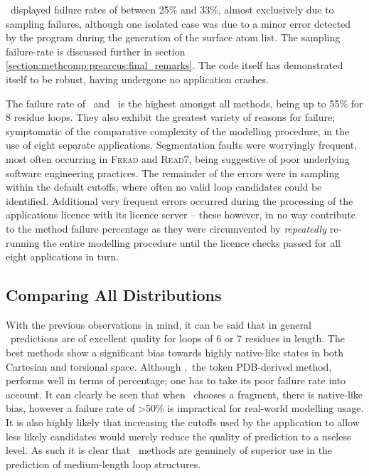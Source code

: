 \prearcus\ displayed failure rates of between 25\% and 33\%, almost exclusively due to sampling failures, although one isolated case was due to a minor error detected by the program during the generation of the surface atom list.
The sampling failure-rate is discussed further in section 
\ref{section:methcomp:prearcus:final_remarks}. The code itself has demonstrated itself to be robust, having undergone no application crashes.

The failure rate of \petra\ and \coda\ is the highest amongst all methods, being up to 55\% for 8 residue loops. They also exhibit the greatest variety of reasons for failure; symptomatic of the comparative complexity of the modelling procedure, in the use of eight separate applications. Segmentation faults were worryingly frequent, most often occurring in  \textsc{Fread} and \textsc{Read7}, being suggestive of poor underlying software engineering practices. The remainder of the errors were in sampling within the default cutoffs, where often no valid loop candidates could be identified.
Additional very frequent errors occurred during the processing of the applications licence with its licence server -- these however, in no way contribute to the method failure percentage as they were circumvented by \emph{repeatedly} re-running the entire modelling procedure until the licence checks passed for all eight applications in turn.


\subsection{Comparing All Distributions}

With the previous observations in mind, it can be said that in general \abinitio\ predictions are of excellent quality for loops of 6 or 7 residues in length. The best methods show a significant bias towards highly native-like states in both Cartesian and torsional space. Although \coda,\ the token PDB-derived method, performs well in terms of percentage; one has to take its poor failure rate into account. It can clearly be seen that when \coda\ chooses a fragment, there is native-like bias, however a failure rate of \textgreater50\% is impractical for real-world modelling usage. It is also highly likely that increasing the cutoffs used by the application to allow less likely candidates would merely reduce the quality of prediction to a useless level. As such it is clear that \abinitio\ methods are genuinely of superior use in the prediction of medium-length loop structures.


